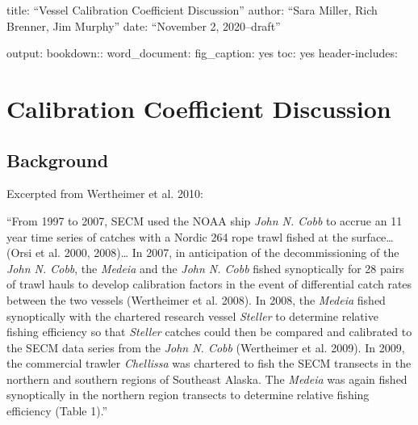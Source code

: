 \documentclass[]{article}
\author{}
\date{\vspace{-2.5em}}
\begin{document}
title: ``Vessel Calibration Coefficient Discussion'' author: ``Sara
Miller, Rich Brenner, Jim Murphy'' date: ``November 2, 2020--draft''

output: bookdown:: word\_document: fig\_caption: yes toc: yes
header-includes: \usepackage{float}

\section{Calibration Coefficient
Discussion}\label{calibration-coefficient-discussion}

\subsection{Background}\label{background}

Excerpted from Wertheimer et al. 2010:

``From 1997 to 2007, SECM used the NOAA ship \emph{John N. Cobb} to
accrue an 11 year time series of catches with a Nordic 264 rope trawl
fished at the surface\ldots{} (Orsi et al. 2000, 2008)\ldots{} In 2007,
in anticipation of the decommissioning of the \emph{John N. Cobb}, the
\emph{Medeia} and the \emph{John N. Cobb} fished synoptically for 28
pairs of trawl hauls to develop calibration factors in the event of
differential catch rates between the two vessels (Wertheimer et al.
2008). In 2008, the \emph{Medeia} fished synoptically with the chartered
research vessel \emph{Steller} to determine relative fishing efficiency
so that \emph{Steller} catches could then be compared and calibrated to
the SECM data series from the \emph{John N. Cobb} (Wertheimer et al.
2009). In 2009, the commercial trawler \emph{Chellissa} was chartered to
fish the SECM transects in the northern and southern regions of
Southeast Alaska. The \emph{Medeia} was again fished synoptically in the
northern region transects to determine relative fishing efficiency
(Table 1).''

\pagebreak
\end{document}
